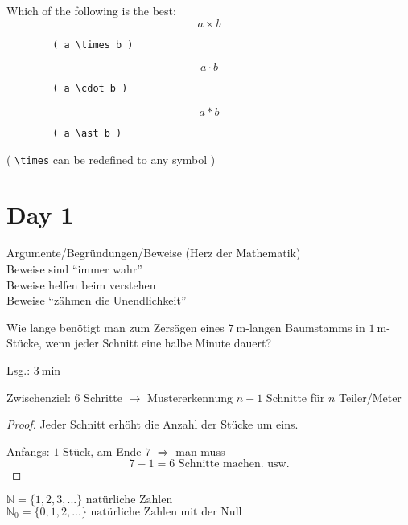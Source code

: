 \documentclass{gadsescript}
\begin{document}
\maketitle



\begin{important}[TODO:]
	Which of the following is the best:
	\[ a \times b \]
	\begin{verbatim}
		( a \times b )
	\end{verbatim}
	\vspace{0.5cm}
	\[ a \cdot b \]
	\begin{verbatim}
		( a \cdot b )
	\end{verbatim}
	\vspace{0.5cm}
	\[ a \ast b \]
	\begin{verbatim}
		( a \ast b )
	\end{verbatim}
	\vspace{0.5cm}
	( \verb|\times| can be redefined to any symbol )
\end{important}

\section{Day 1}
Argumente/Begründungen/Beweise (Herz der Mathematik)\\
Beweise sind ``immer wahr''\\
Beweise helfen beim verstehen\\
Beweise ``zähmen die Unendlichkeit''\par

\begin{problem}
	Wie lange benötigt man zum Zersägen eines $\qty{7}{\meter}$-langen Baumstamms in $\qty{1}{\meter}$-Stücke, wenn jeder Schnitt eine halbe Minute dauert?\par
	Lsg.: $\qty{3}{\minute}$\par
	Zwischenziel: 6 Schritte $\rightarrow$ Mustererkennung $n-1$ Schnitte für $n$ Teiler/Meter\par
	\begin{proof}
		Jeder Schnitt erhöht die Anzahl der Stücke um eins.\par
		Anfangs: $1$ Stück, am Ende $7$ $\Rightarrow$ man muss \[7 - 1 = 6 \text{ Schnitte machen. usw.}\]
	\end{proof}
\end{problem}

$\mathbb{N} = \{1, 2, 3, ...\} \text{ natürliche Zahlen}$\\
$\mathbb{N}_0 = \{0, 1, 2, ...\} \text{ natürliche Zahlen mit der Null}$\par
\end{document}
